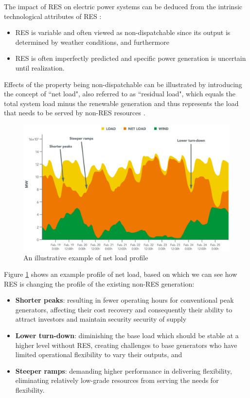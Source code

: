 The impact of RES on electric power systems can be deduced from the intrinsic technological attributes of RES \cite{Kondziella2016,Edenhofer2013}:
\begin{itemize}
	\item RES is variable and often viewed as non-dispatchable since its output is determined by weather conditions, and furthermore
	\item RES is often imperfectly predicted and specific power generation is uncertain until realization.
\end{itemize}

Effects of the property being non-dispatchable can be illustrated by introducing the concept of ``net load", also referred to as ``residual load", which equals the total system load minus the renewable generation and thus represents the load that needs to be served by non-RES resources \cite{Cochran2014,Muller2016,Ueckerdt2015}.

\begin{figure}[h!]
	\centering
	\includegraphics[width=0.9\linewidth]{Figures/NetLoad}
	\caption{An illustrative example of net load profile \cite{Cochran2014}}
	\label{fig:net-load}
\end{figure}

Figure \ref{fig:net-load} shows an example profile of net load, based on which we can see how RES is changing the profile of the existing non-RES generation:

\begin{itemize}
	\item \textbf{Shorter peaks}: resulting in fewer operating hours for conventional peak generators, affecting their cost recovery and consequently their ability to attract investors and maintain security security of supply
	\item \textbf{Lower turn-down}: diminishing the base load which should be stable at a higher level without RES, creating challenges to base generators who have limited operational flexibility to vary their outputs, and
	\item \textbf{Steeper ramps}: demanding higher performance in delivering flexibility, eliminating relatively low-grade resources from serving the needs for flexibility.
\end{itemize}

